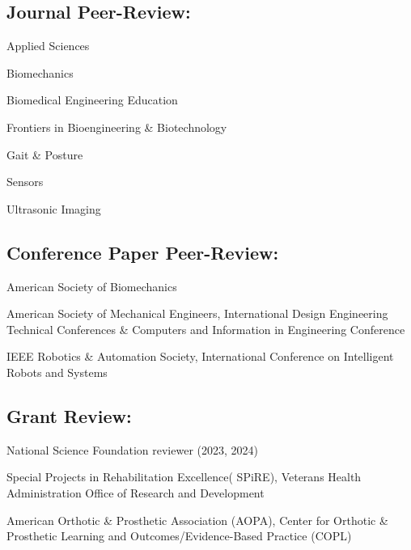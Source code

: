 \documentclass[letterpaper, 10pt]{article}
\begin{document}
\subsection{Journal Peer-Review:}
\begin{compactitem} %
    \item Applied Sciences    
    \item Biomechanics
    \item Biomedical Engineering Education
    \item Frontiers in Bioengineering \& Biotechnology
    \item Gait \& Posture
    \item Sensors
    \item Ultrasonic Imaging
\end{compactitem}%

\subsection{Conference Paper Peer-Review:}
\begin{compactitem} %
    \item American Society of Biomechanics
    \item American Society of Mechanical Engineers, International Design Engineering Technical Conferences \& Computers and Information in Engineering Conference
    \item IEEE Robotics \& Automation Society, International Conference on Intelligent Robots and Systems
\end{compactitem}%

\subsection{Grant Review:}
\begin{compactitem} %
    \item National Science Foundation reviewer (2023, 2024) %
    \item Special Projects in Rehabilitation Excellence( SPiRE), Veterans Health Administration Office of Research and Development
    \item American Orthotic \& Prosthetic Association (AOPA), Center for Orthotic \& Prosthetic Learning and Outcomes/Evidence-Based Practice (COPL)
\end{compactitem} %
\end{document}
